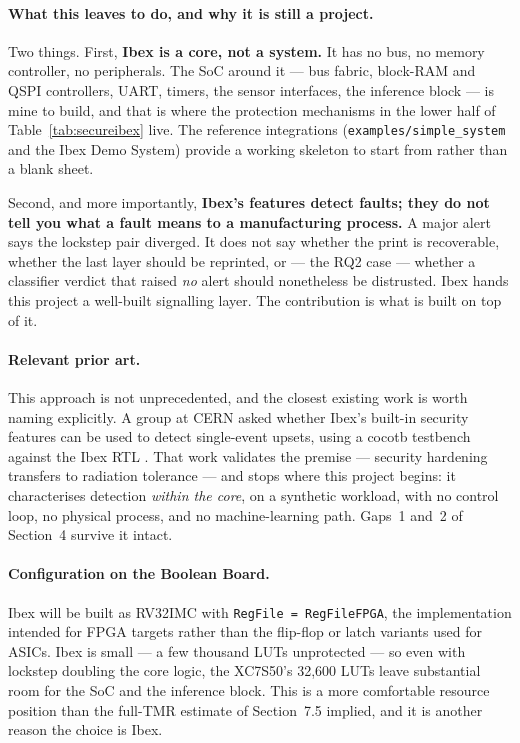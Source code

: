 \documentclass[11pt,a4paper]{article}
\begin{document}
\paragraph{What this leaves to do, and why it is still a project.}
Two things. First, \textbf{Ibex is a core, not a system.} It has no bus, no
memory controller, no peripherals. The SoC around it --- bus fabric, block-RAM
and QSPI controllers, UART, timers, the sensor interfaces, the inference block
--- is mine to build, and that is where the protection mechanisms in the lower
half of Table~\ref{tab:secureibex} live. The reference integrations
(\texttt{examples/simple\_system} and the Ibex Demo System) provide a working
skeleton to start from rather than a blank sheet.

Second, and more importantly, \textbf{Ibex's features detect faults; they do not
tell you what a fault means to a manufacturing process.} A major alert says the
lockstep pair diverged. It does not say whether the print is recoverable, whether
the last layer should be reprinted, or --- the RQ2 case --- whether a classifier
verdict that raised \emph{no} alert should nonetheless be distrusted. Ibex hands
this project a well-built signalling layer. The contribution is what is built on
top of it.

\paragraph{Relevant prior art.}
This approach is not unprecedented, and the closest existing work is worth naming
explicitly. A group at CERN asked whether Ibex's built-in security features can
be used to detect single-event upsets, using a cocotb testbench against the Ibex
RTL \cite{twepp2023ibex}. That work validates the premise --- security hardening
transfers to radiation tolerance --- and stops where this project begins: it
characterises detection \emph{within the core}, on a synthetic workload, with no
control loop, no physical process, and no machine-learning path. Gaps~1 and~2 of
Section~4 survive it intact.

\paragraph{Configuration on the Boolean Board.}
Ibex will be built as RV32IMC with \texttt{RegFile = RegFileFPGA}, the
implementation intended for FPGA targets rather than the flip-flop or latch
variants used for ASICs. Ibex is small --- a few thousand LUTs unprotected ---
so even with lockstep doubling the core logic, the XC7S50's 32{,}600 LUTs leave
substantial room for the SoC and the inference block. This is a more comfortable
resource position than the full-TMR estimate of Section~7.5 implied, and it is
another reason the choice is Ibex.
\end{document}
